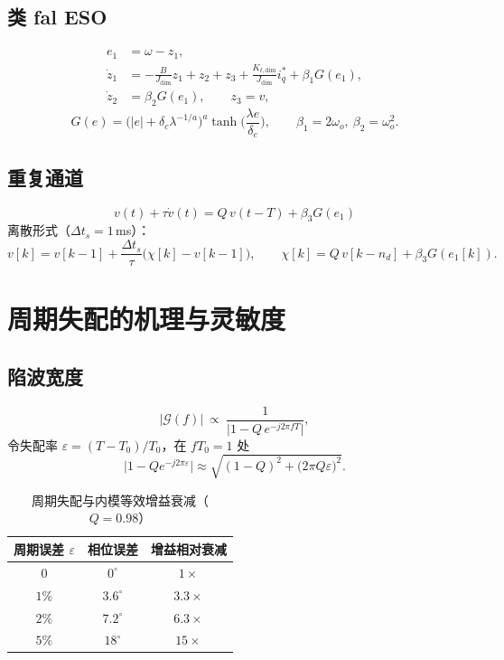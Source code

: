 \documentclass[UTF8,fontset=windows,a4paper,11pt]{ctexart}
\begin{document}
\subsection{类 fal ESO}
\begin{align}
e_1&=\omega-z_1,\\
\dot z_1&=-\frac{B}{J_{\mathrm{dim}}}z_1+z_2+z_3+\frac{K_{t,\mathrm{dim}}}{J_{\mathrm{dim}}}i_q^*+\beta_1G(e_1),\\
\dot z_2&=\beta_2G(e_1),\qquad z_3=v,
\end{align}
\begin{equation}
G(e)=\Big(|e|+\delta_c\lambda^{-1/a}\Big)^{a}\tanh\!\Big(\frac{\lambda e}{\delta_c}\Big),
\qquad \beta_1=2\omega_o,\ \beta_2=\omega_o^2 .
\end{equation}

\subsection{重复通道}
\begin{equation}
\boxed{\;v(t)+\tau\dot v(t)=Q\,v(t-T)+\beta_3G(e_1)\;}
\label{eq:rc}
\end{equation}
离散形式（$\Delta t_s=1$\,ms）：
\begin{equation}
v[k]=v[k-1]+\frac{\Delta t_s}{\tau}\big(\chi[k]-v[k-1]\big),\qquad
\chi[k]=Q\,v[k-n_d]+\beta_3G(e_1[k]).
\end{equation}

\section{周期失配的机理与灵敏度}

\subsection{陷波宽度}
\begin{equation}
\big|\mathcal{G}(f)\big|\ \propto\ \frac{1}{\big|1-Q\,e^{-j2\pi fT}\big|},
\end{equation}
令失配率 $\varepsilon=(T-T_0)/T_0$，在 $fT_0=1$ 处
\begin{equation}
\big|1-Qe^{-j2\pi\varepsilon}\big|\approx
\sqrt{(1-Q)^2+\big(2\pi Q\varepsilon\big)^2}.
\end{equation}

\begin{table}[h]
\centering
\caption{周期失配与内模等效增益衰减（$Q=0.98$）}
\begin{tabular}{@{}ccc@{}}
\toprule
周期误差 $\varepsilon$ & 相位误差 & 增益相对衰减 \\
\midrule
$0$      & $0^\circ$  & $1\times$ \\
$1\%$    & $3.6^\circ$& $3.3\times$ \\
$2\%$    & $7.2^\circ$& $6.3\times$ \\
$5\%$    & $18^\circ$ & $15\times$ \\
\bottomrule
\end{tabular}
\end{table}
\end{document}
